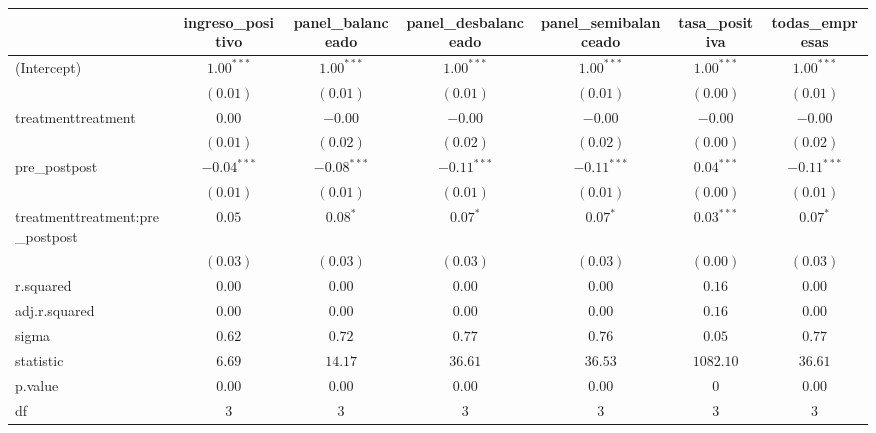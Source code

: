 \documentclass[
  letterpaper,
  DIV=11,
  numbers=noendperiod]{scrartcl}
\begin{document}
\begin{tabular}{l c c c c c c}
\hline
 & ingreso_positivo & panel_balanceado & panel_desbalanceado & panel_semibalanceado & tasa_positiva & todas_empresas \\
\hline
(Intercept)                      & $1.00^{***}$  & $1.00^{***}$  & $1.00^{***}$  & $1.00^{***}$  & $1.00^{***}$ & $1.00^{***}$  \\
                                 & $(0.01)$      & $(0.01)$      & $(0.01)$      & $(0.01)$      & $(0.00)$     & $(0.01)$      \\
treatmenttreatment               & $0.00$        & $-0.00$       & $-0.00$       & $-0.00$       & $-0.00$      & $-0.00$       \\
                                 & $(0.01)$      & $(0.02)$      & $(0.02)$      & $(0.02)$      & $(0.00)$     & $(0.02)$      \\
pre\_postpost                    & $-0.04^{***}$ & $-0.08^{***}$ & $-0.11^{***}$ & $-0.11^{***}$ & $0.04^{***}$ & $-0.11^{***}$ \\
                                 & $(0.01)$      & $(0.01)$      & $(0.01)$      & $(0.01)$      & $(0.00)$     & $(0.01)$      \\
treatmenttreatment:pre\_postpost & $0.05$        & $0.08^{*}$    & $0.07^{*}$    & $0.07^{*}$    & $0.03^{***}$ & $0.07^{*}$    \\
                                 & $(0.03)$      & $(0.03)$      & $(0.03)$      & $(0.03)$      & $(0.00)$     & $(0.03)$      \\
\hline
r.squared                        & $0.00$        & $0.00$        & $0.00$        & $0.00$        & $0.16$       & $0.00$        \\
adj.r.squared                    & $0.00$        & $0.00$        & $0.00$        & $0.00$        & $0.16$       & $0.00$        \\
sigma                            & $0.62$        & $0.72$        & $0.77$        & $0.76$        & $0.05$       & $0.77$        \\
statistic                        & $6.69$        & $14.17$       & $36.61$       & $36.53$       & $1082.10$    & $36.61$       \\
p.value                          & $0.00$        & $0.00$        & $0.00$        & $0.00$        & $0$          & $0.00$        \\
df                               & $3$           & $3$           & $3$           & $3$           & $3$          & $3$           \\

\end{tabular}
\end{document}
